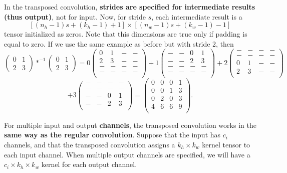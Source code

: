 In the transposed convolution, \textbf{strides are specified for intermediate results (thus output)}, not for input. Now, for stride $s$, each intermediate result is a $$[(n_h-1)s+(k_h-1)+1]\times[(n_w-1)s+(k_w-1)-1]$$ tensor initialized as zeros. Note that this dimensions are true only if padding is equal to zero. If we use the same example as before but with stride 2, then
$$
\begin{pmatrix}
0 & 1 \\ 2 & 3
\end{pmatrix} *^{-1} \begin{pmatrix}
0 & 1 \\ 2 & 3
\end{pmatrix}
=
0 
\begin{pmatrix}
0 & 1 & - & - \\
2 & 3 & - & - \\
- & - & - & - \\
- & - & - & - \\
\end{pmatrix} +
1 
\begin{pmatrix}
- & - & 0 & 1 \\
- & - & 2 & 3 \\
- & - & - & - \\
- & - & - & - \\
\end{pmatrix} +
2 
\begin{pmatrix}
- & - & - & - \\
- & - & - & - \\
0 & 1 & - & - \\
2 & 3 & - & - \\
\end{pmatrix}
$$
$$
+3
\begin{pmatrix}
- & - & - & - \\
- & - & - & - \\
- & - & 0 & 1 \\
- & - & 2 & 3 \\
\end{pmatrix}
=
\begin{pmatrix}
0 & 0 & 0 & 1 \\
0 & 0 & 1 & 3 \\
0 & 2 & 0 & 3 \\
4 & 6 & 6 & 9 \\
\end{pmatrix}.
$$

For multiple input and output \textbf{channels}, the transposed convolution works in the \textbf{same way as the regular convolution}. Suppose that the input has $c_i$ channels, and that the transposed convolution assigns a $k_h\times k_w$ kernel tensor to each input channel. When multiple output channels are specified, we will have a $c_i\times k_h\times k_w$ kernel for each output channel.

